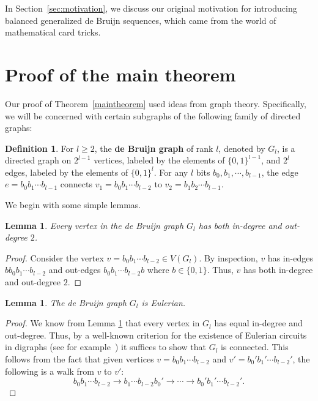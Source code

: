 \documentclass{article}
\theoremstyle{plain}
\newtheorem{lemma}[theorem]{Lemma}
\theoremstyle{definition}
\newtheorem{definition}[theorem]{Definition}
\theoremstyle{remark}
\begin{document}
In Section~\ref{sec:motivation}, we discuss our original motivation for introducing balanced generalized de Bruijn sequences, which came from the world of mathematical card tricks.

\section{Proof of the main theorem}

Our proof of Theorem~\ref{maintheorem} used ideas from graph theory. Specifically, we will be concerned with certain subgraphs of the following family of directed graphs:

\begin{definition}
For $l \geqslant 2$, the \textbf{de Bruijn graph} of rank $l$, denoted by $G_l$, is a directed graph on $2^{l-1}$ vertices, labeled by the elements of $\{0,1\}^{l-1}$, and $2^l$ edges, labeled by the elements of $\{0,1\}^l$. For any $l$ bits $b_0,b_1,\cdots,b_{l-1}$, the edge $e=b_0b_1\cdots b_{l-1}$ connects $v_1 = b_0b_1\cdots b_{l-2}$ to $v_2 = b_1b_2\cdots b_{l-1}$.
\end{definition}

We begin with some simple lemmas.

\medskip

\begin{lemma}\label{inoutdeg}
Every vertex in the de Bruijn graph $G_l$ has both in-degree and out-degree $2$.
\end{lemma}

\begin{proof}
Consider the vertex $v = b_0b_1\cdots b_{l-2} \in V(G_l)$. By inspection, $v$ has in-edges $b b_0b_1\cdots b_{l-2}$ and out-edges $b_0b_1\cdots b_{l-2}b$ where $b \in \{0,1\}$. Thus, $v$ has both in-degree and out-degree $2$.
\end{proof}

\medskip

\begin{lemma}
The de Bruijn graph $G_l$ is Eulerian.
\end{lemma}

\begin{proof}
We know from Lemma \ref{inoutdeg} that every vertex in $G_l$ has equal in-degree and out-degree. Thus, by a well-known criterion for the existence of Eulerian circuits in digraphs (see for example~\cite[Theorem 13.1.2 ]{Brualdi}) it suffices to show that $G_l$ is connected. This follows from the fact that given vertices $v = b_0b_1\cdots b_{l-2}$ and $v' = b_0'b_1'\cdots b_{l-2}'$, the following is a walk from $v$ to $v'$:
\[b_0b_1\cdots b_{l-2} \to b_1\cdots b_{l-2}b_0' \to \cdots \to b_0'b_1'\cdots b_{l-2}' .\]
\end{proof}
\end{document}
